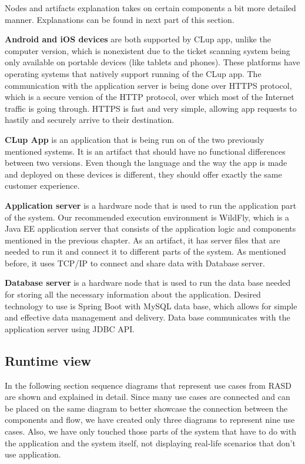   

Nodes and artifacts explanation takes on certain components a bit more detailed manner. Explanations can be found in next part of this section.

\newpage

\textbf{Android and iOS devices} are both supported by CLup app, unlike the computer version, which is nonexistent due to the ticket scanning system being only available on portable devices (like tablets and phones). These platforms have operating systems that natively support running of the CLup app. The communication with the application server is being done over HTTPS protocol, which is a secure version of the HTTP protocol, over which most of the Internet traffic is going through. HTTPS is fast and very simple, allowing app requests to hastily and securely arrive to their destination.  \newline

\textbf{CLup App} is an application that is being run on of the two previously mentioned systems. It is an artifact that should have no functional differences between two versions. Even though the language and the way the app is made and deployed on these devices is different, they should offer exactly the same customer experience. \newline

\textbf{Application server} is a hardware node that is used to run the application part of the system. Our recommended execution environment is WildFly, which is a Java EE application server that consists of the application logic and components mentioned in the previous chapter. As an artifact, it has server files that are needed to run it and connect it to different parts of the system. As mentioned before, it uses TCP/IP to connect and share data with Database server.  \newline


\textbf{Database server} is a hardware node that is used to run the data base needed for storing all the necessary information about the application. Desired technology to use is Spring Boot with MySQL data base, which allows for simple and effective data management and delivery. Data base communicates with the application server using JDBC API.    \newline

\newpage

\subsection{Runtime view}
\hspace{\parindent} In the following section sequence diagrams that represent use cases from RASD are shown and explained in detail. Since many use cases are connected and can be placed on the same diagram to better showcase the connection between the components and flow, we have created only three diagrams to represent nine use cases. Also, we have only touched those parts of the system that have to do with the application and the system itself, not displaying real-life scenarios that don't use application.  

